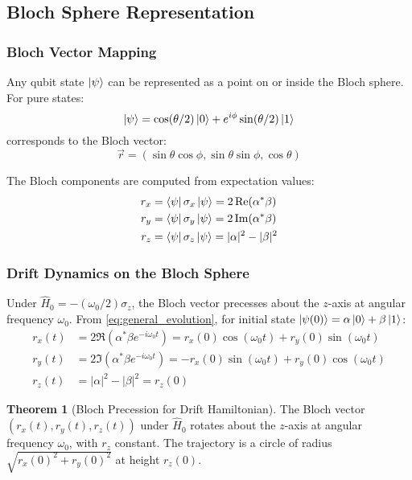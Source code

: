 \documentclass[11pt,a4paper]{article}
\theoremstyle{definition}
\newtheorem{theorem}{Theorem}[section]
\theoremstyle{remark}
\begin{document}
\subsection{Bloch Sphere Representation}

\subsubsection{Bloch Vector Mapping}

Any qubit state $\ket{\psi}$ can be represented as a point on or inside the Bloch sphere. For pure states:
\begin{equation}
\ket{\psi} = \cos(\theta/2) \ket{0} + e^{i\phi} \sin(\theta/2) \ket{1}
\end{equation}
corresponds to the Bloch vector:
\begin{equation}
\vec{r} = (\sin\theta \cos\phi, \sin\theta \sin\phi, \cos\theta)
\end{equation}

The Bloch components are computed from expectation values:
\begin{align}
r_x &= \bra{\psi} \sigma_x \ket{\psi} = 2 \Re(\alpha^* \beta) \\
r_y &= \bra{\psi} \sigma_y \ket{\psi} = 2 \Im(\alpha^* \beta) \\
r_z &= \bra{\psi} \sigma_z \ket{\psi} = |\alpha|^2 - |\beta|^2
\end{align}

\subsubsection{Drift Dynamics on the Bloch Sphere}

Under $\hat{H}_0 = -(\omega_0/2) \sigma_z$, the Bloch vector precesses about the $z$-axis at angular frequency $\omega_0$. From \eqref{eq:general_evolution}, for initial state $\ket{\psi(0)} = \alpha \ket{0} + \beta \ket{1}$:
\begin{align}
r_x(t) &= 2 \Re\left(\alpha^* \beta e^{-i \omega_0 t}\right) = r_x(0) \cos(\omega_0 t) + r_y(0) \sin(\omega_0 t) \\
r_y(t) &= 2 \Im\left(\alpha^* \beta e^{-i \omega_0 t}\right) = -r_x(0) \sin(\omega_0 t) + r_y(0) \cos(\omega_0 t) \\
r_z(t) &= |\alpha|^2 - |\beta|^2 = r_z(0)
\end{align}

\begin{theorem}[Bloch Precession for Drift Hamiltonian]
The Bloch vector $(r_x(t), r_y(t), r_z(t))$ under $\hat{H}_0$ rotates about the $z$-axis at angular frequency $\omega_0$, with $r_z$ constant. The trajectory is a circle of radius $\sqrt{r_x(0)^2 + r_y(0)^2}$ at height $r_z(0)$.
\end{theorem}
\end{document}
